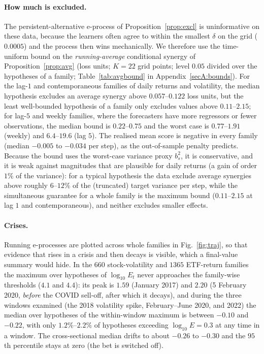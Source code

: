 \documentclass[pdflatex,sn-mathphys-ay]{sn-jnl}%
\theoremstyle{thmstyleone}%
\theoremstyle{thmstyletwo}%
\theoremstyle{thmstylethree}%
\begin{document}
\paragraph{How much is excluded.} The persistent-alternative e-process of Proposition~\ref{prop:excl} is uninformative on these data, because the learners often agree to within the smallest $\delta$ on the grid ($0.0005$) and the process then wins mechanically. We therefore use the time-uniform bound on the \emph{running-average} conditional synergy of Proposition~\ref{prop:avg}
(loss units; $K=22$ grid points; level $0.05$ divided over the hypotheses of a family; Table~\ref{tab:avgbound} in Appendix~\ref{secA:bounds}). For the lag-$1$ and contemporaneous families of daily returns and volatility, the median hypothesis excludes an average synergy above $0.057$--$0.122$ loss units,
but the least well-bounded hypothesis of a family only excludes values above $0.11$--$2.15$; for lag-$5$ and weekly families, where the forecasters have more regressors or fewer observations, the median bound is $0.22$--$0.75$ and the worst case is $0.77$--$1.91$ (weekly) and $6.4$--$19.6$ (lag $5$). The realised mean score is negative in every family (median $-0.005$ to $-0.034$ per step), as the out-of-sample penalty predicts.
Because the bound uses the worst-case variance proxy $b_s^2$, it is conservative, and it is weak against magnitudes that are plausible for daily returns (a gain of order $1\%$ of the variance): for a typical hypothesis the data exclude average synergies above roughly $6$--$12\%$ of the (truncated) target variance per step, while the simultaneous guarantee for a whole family is the maximum bound ($0.11$--$2.15$ at lag $1$ and contemporaneous), and neither excludes smaller effects.

\paragraph{Crises.} Running e-processes are plotted across whole families in Fig.~\ref{fig:traj}, so that evidence that rises in a crisis and then decays is visible, which a final-value summary would hide. In the $660$ stock-volatility and $1365$ ETF-return families the maximum over hypotheses of $\log_{10}E_t$ never approaches the family-wise thresholds ($4.1$ and $4.4$): its peak is $1.59$ (January 2017) and $2.20$ (5 February 2020, \emph{before} the COVID sell-off, after which it decays), and during the three windows examined (the 2018 volatility spike, February--June 2020, and 2022) the median over hypotheses of the within-window maximum is between $-0.10$ and $-0.22$, with only $1.2\%$--$2.2\%$ of hypotheses exceeding $\log_{10}E=0.3$ at any time in a window. The cross-sectional median drifts to about $-0.26$ to $-0.30$ and the $95$th percentile stays at zero (the bet is switched off).
\end{document}
